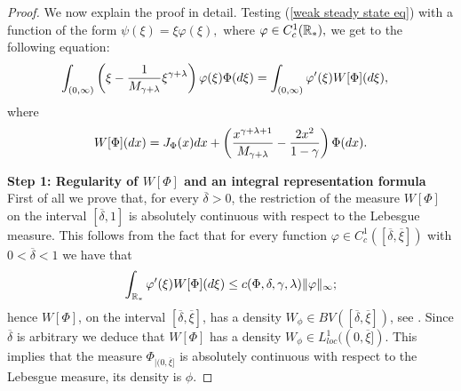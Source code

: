 \documentclass[11pt]{article}
\numberwithin{equation}{section}
\theoremstyle{plain}
\newcommand{\der}{\textup{d}}
\begin{document}
\begin{proof}
We now explain the proof in detail. 
Testing (\ref{weak steady state eq}) with a function of the form $\psi(\xi)=\xi\varphi(\xi),$ where $\varphi\in\textup{C}^{1}_{c}(\mathbb R_*),$ we get to the following equation:
\begin{align}\label{weak flux form}
\int_{(0,\infty)}&\left( \xi -\frac{1}{M_{\gamma+\lambda}} \xi^{\gamma+\lambda} \right) \varphi(\xi)\Phi(\der \xi )
 =\int_{(0,\infty)}\varphi'(\xi)W[\Phi](\der \xi ) ,
\end{align}
where
\begin{align} \label{def W}
   W[\Phi](\der x)= J_\Phi (x) \der x + \left( \frac{x^{\gamma+\lambda +1 } }{ M_{\gamma + \lambda } } - \frac{2 x^2 }{1- \gamma }\right) \Phi(\der x ).
\end{align}

\textbf{Step 1: Regularity of $W[\Phi]$ and an integral representation formula}\\

First of all we prove that, for every $\overline \delta >0$, the restriction of the measure $W[\Phi] $ on the interval $[\overline \delta, 1 ]$ is absolutely continuous with respect to the Lebesgue measure. 
This follows from the fact that for every function $\varphi \in C^1_c([\overline \delta, \overline \xi ])$ with $ 0 < \overline \delta < 1$ we have that 
\[
\int_{\mathbb R_*} \varphi'(\xi)W[\Phi](\der \xi ) \leq c(\Phi, \delta, \gamma, \lambda)  \| \varphi \|_\infty; 
\]
hence $W[\Phi]$, on the interval $[\overline \delta,\overline \xi]$, has a density $W_\phi \in BV([\overline \delta, \overline \xi] )$, see \cite{gariepy2001functions}. 
Since $\overline \delta $ is arbitrary we deduce that $W[\Phi]$ has a density $W_\phi \in L^{1}_{loc}((0, \overline \xi] )$.
This implies that the measure $\Phi_{| (0, \overline \xi ]}$ is absolutely continuous with respect to the Lebesgue measure, its density is $\phi$. 


\end{proof}
\end{document}
